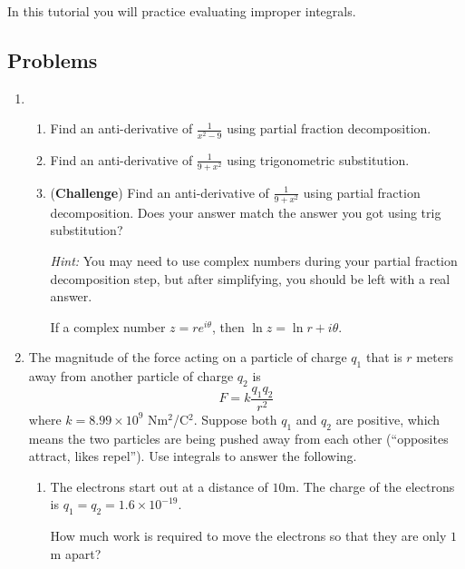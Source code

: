 \begin{objectives}
	In this tutorial you will practice evaluating improper integrals.
\end{objectives}

\vspace{-.5em}
\subsection*{Problems}
\vspace{-.5em}


\begin{enumerate}
	\item 
	
\begin{enumerate}
    \item Find an anti-derivative of  $\frac{1}{x^2 - 9}$ using partial fraction decomposition.
    \item Find an anti-derivative of  $\frac{1}{9 + x^2}$ using trigonometric substitution.
    \item (\textbf{Challenge}) Find an anti-derivative of  $\frac{1}{9 + x^2}$ using partial fraction decomposition. Does your answer match the answer you got using trig substitution?

    \emph{Hint:} You may need to use complex numbers during your partial fraction decomposition step, but after simplifying, you should be left with a real answer.

    If a complex number $z=re^{i\theta}$, then $\ln z = \ln r + i\theta$.
\end{enumerate}

\item The magnitude of the force acting on a particle of charge $q_1$ that is $r$ meters away from another particle of charge $q_2$ is
   	\[
	  	F =k\frac{q_1 q_2}{r^2}
   	\]
    where $k = 8.99 \times 10^9$ Nm$^2$/C$^2$. Suppose both $q_1$ and $q_2$ are positive, which means the two particles are being pushed away from each other (``opposites attract, likes repel''). Use integrals to answer the following.
    \begin{enumerate}
        \item The electrons start out at a distance of $10$m.
        The charge of the electrons is $q_1=q_2=1.6\times 10^{-19}$.

        How much work is required to move the electrons so that they
        are only $1$m apart?
        

\end{enumerate}
\end{enumerate}

